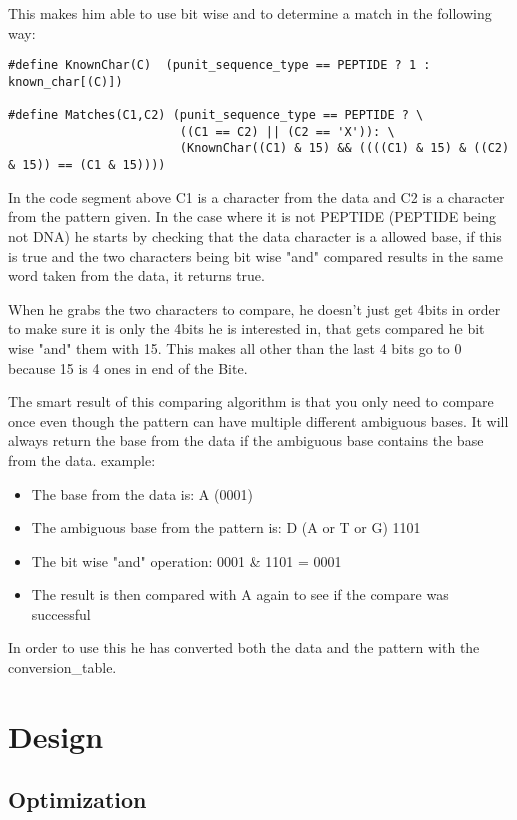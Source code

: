 \documentclass[12pt]{article}
\begin{document}
This makes him able to use bit wise and to determine a match in the following way:
\begin{lstlisting}
#define KnownChar(C)  (punit_sequence_type == PEPTIDE ? 1 : known_char[(C)])

#define Matches(C1,C2) (punit_sequence_type == PEPTIDE ? \
                        ((C1 == C2) || (C2 == 'X')): \
                        (KnownChar((C1) & 15) && ((((C1) & 15) & ((C2) & 15)) == (C1 & 15))))

\end{lstlisting}
In the code segment above C1 is a character from the data and C2 is a character from the pattern given. In the case where it is not PEPTIDE (PEPTIDE being not DNA) he starts by checking that the data character is a allowed base, if this is true and the two characters being bit wise "and" compared results in the same word taken from the data, it returns true. 

When he grabs the two characters to compare, he doesn't just get 4bits in order to make sure it is only the 4bits he is interested in, that gets compared he bit wise "and" them with 15. This makes all other than the last 4 bits go to 0 because 15 is 4 ones in end of the Bite.

The smart result of this comparing algorithm is that you only need to compare once even though the pattern can have multiple different ambiguous bases. It will always return the base from the data if the ambiguous base contains the base from the data. example: \\
\begin{itemize}
\item The base from the data is: A (0001)
\item The ambiguous base from the pattern is: D (A or T or G) 1101
\item The bit wise "and" operation: 0001 \& 1101 = 0001
\item The result is then compared with A again to see if the compare was successful
\end{itemize}
 
In order to use this he has converted both the data and the pattern with the conversion\_table. \\
\section{Design}
\subsection{Optimization}
\end{document}
